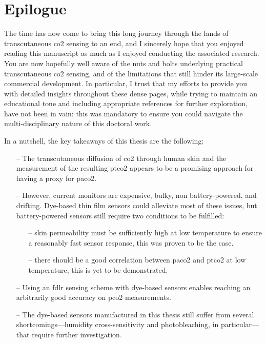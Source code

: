 \section{Epilogue}

The time has now come to bring this long journey through the lands of transcutaneous \gls{co2} sensing to an end, and I sincerely hope that you enjoyed reading this manuscript as much as I enjoyed conducting the associated research. You are now hopefully well aware of the nuts and bolts underlying practical transcutaneous \gls{co2} sensing, and of the limitations that still hinder its large-scale commercial development. In particular, I trust that my efforts to provide you with detailed insights throughout these dense pages, while trying to maintain an educational tone and including appropriate references for further exploration, have not been in vain: this was mandatory  to ensure you could navigate the multi-disciplinary nature of this doctoral work.

\begin{keypointbox}
	In a nutshell, the key takeaways of this thesis are the following:
	\begin{itemize}
		\item[--] The transcutaneous diffusion of \gls{co2} through human skin and the measurement of the resulting \gls{ptco2} appears to be a promising approach for having a proxy for \gls{paco2}.
		\item[--] However, current monitors are expensive, bulky, non battery-powered, and drifting. Dye-based thin film sensors could alleviate most of these issues, but battery-powered sensors still require two conditions to be fulfilled:
		\begin{enumerate}
			\item[--] skin permeability must be sufficiently high at low temperature to ensure a reasonably fast sensor response, this was proven to be the case.
			\item[--] there should be a good correlation between \gls{paco2} and \gls{ptco2} at low temperature, this is yet to be demonstrated.
		\end{enumerate}
		\item[--] Using an \gls{fdlr} sensing scheme with dye-based sensors enables reaching an arbitrarily good accuracy on \gls{pco2} measurements.
		\item[--] The dye-based sensors manufactured in this thesis still suffer from several shortcomings---humidity cross-sensitivity and photobleaching, in particular---that require further investigation.
	\end{itemize}
\end{keypointbox}

